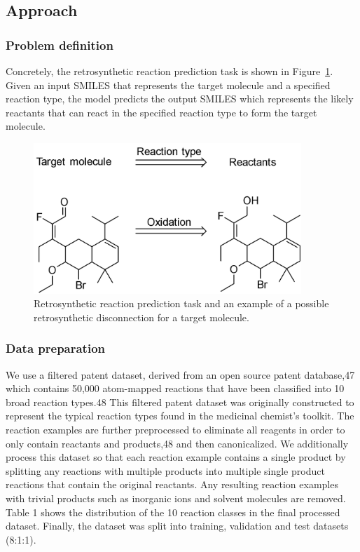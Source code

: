 \subsection{Approach}

\subsubsection{Problem definition}
Concretely, the retrosynthetic reaction prediction task is shown in Figure~\ref{fig:ret_problem_example}. Given an input SMILES that represents the target molecule and a specified reaction type, the model predicts the output SMILES which represents the likely reactants that can react in the specified reaction type to form the target molecule. 


\begin{figure}
  \centering
  \includegraphics[width=0.9\textwidth]{Images/ret_problem_definition.png}
  \caption{Retrosynthetic reaction prediction task and an example of a possible retrosynthetic disconnection for a target molecule.}
  \label{fig:ret_problem_example}
\end{figure}

\subsubsection{Data preparation}

We use a filtered patent dataset, derived from an open source patent database,47 which contains 50,000 atom-mapped reactions that have been classified into 10 broad reaction types.48 This filtered patent dataset was originally constructed to represent the typical reaction types found in the medicinal chemist’s toolkit. The reaction examples are further preprocessed to eliminate all reagents in order to only contain reactants and products,48 and then canonicalized. We additionally process this dataset so that each reaction example contains a single product by splitting any reactions with multiple products into multiple single product reactions that contain the original reactants. Any resulting reaction examples with trivial products such as inorganic ions and solvent molecules are removed. Table 1 shows the distribution of the 10 reaction classes in the final processed dataset. Finally, the dataset was split into training, validation and test datasets (8:1:1). 

